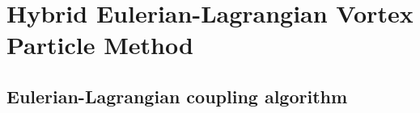 \chapter{Hybrid Eulerian-Lagrangian Vortex Particle Method}
\label{ch:hybrid}







\section{Eulerian-Lagrangian coupling algorithm}


	
	
	

